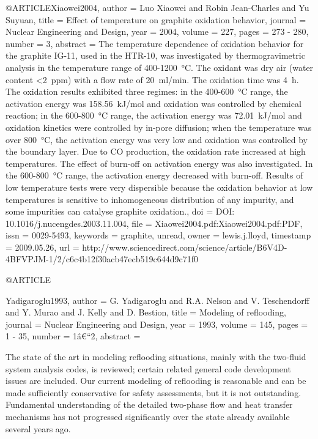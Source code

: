 {{@ARTICLE{Xiaowei2004,
  author = {Luo Xiaowei and Robin Jean-Charles and Yu Suyuan},
  title = {Effect of temperature on graphite oxidation behavior},
  journal = {Nuclear Engineering and Design},
  year = {2004},
  volume = {227},
  pages = {273 - 280},
  number = {3},
  abstract = {The temperature dependence of oxidation behavior for the graphite
	IG-11, used in the HTR-10, was investigated by thermogravimetric
	analysis in the temperature range of 400-1200 °C. The oxidant was
	dry air (water content <2 ppm) with a flow rate of 20 ml/min. The
	oxidation time was 4 h. The oxidation results exhibited three regimes:
	in the 400-600 °C range, the activation energy was 158.56 kJ/mol
	and oxidation was controlled by chemical reaction; in the 600-800 °C
	range, the activation energy was 72.01 kJ/mol and oxidation kinetics
	were controlled by in-pore diffusion; when the temperature was over
	800 °C, the activation energy was very low and oxidation was controlled
	by the boundary layer. Due to CO production, the oxidation rate increased
	at high temperatures. The effect of burn-off on activation energy
	was also investigated. In the 600-800 °C range, the activation energy
	decreased with burn-off. Results of low temperature tests were very
	dispersible because the oxidation behavior at low temperatures is
	sensitive to inhomogeneous distribution of any impurity, and some
	impurities can catalyse graphite oxidation.},
  doi = {DOI: 10.1016/j.nucengdes.2003.11.004},
  file = {Xiaowei2004.pdf:Xiaowei2004.pdf:PDF},
  issn = {0029-5493},
  keywords = {graphite, unread},
  owner = {lewis.j.lloyd},
  timestamp = {2009.05.26},
  url = {http://www.sciencedirect.com/science/article/B6V4D-4BFVPJM-1/2/c6c4b12f30acb47ecb519c644d9c71f0}
}

@ARTICLE{Yadigaroglu1993,
  author = {G. Yadigaroglu and R.A. Nelson and V. Teschendorff and Y. Murao and
	J. Kelly and D. Bestion},
  title = {Modeling of reflooding},
  journal = {Nuclear Engineering and Design},
  year = {1993},
  volume = {145},
  pages = {1 - 35},
  number = {1â€“2},
  abstract = {The state of the art in modeling reflooding situations, mainly with
	the two-fluid system analysis codes, is reviewed; certain related
	general code development issues are included. Our current modeling
	of reflooding is reasonable and can be made sufficiently conservative
	for safety assessments, but it is not outstanding. Fundamental understanding
	of the detailed two-phase flow and heat transfer mechanisms has not
	progressed significantly over the state already available several
	years ago.
	
}}}}

